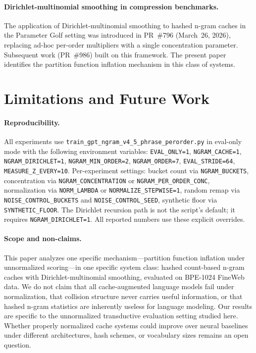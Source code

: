 \documentclass[11pt]{article}
\begin{document}
\paragraph{Dirichlet-multinomial smoothing in compression benchmarks.} The application of Dirichlet-multinomial smoothing to hashed n-gram caches in the Parameter Golf setting was introduced in PR~\#796 (March~26, 2026), replacing ad-hoc per-order multipliers with a single concentration parameter. Subsequent work (PR~\#986) built on this framework. The present paper identifies the partition function inflation mechanism in this class of systems.

\section{Limitations and Future Work}
\label{sec:limitations}

\paragraph{Reproducibility.} All experiments use \texttt{train\_gpt\_ngram\_v4\_5\_phrase\_perorder.py} in eval-only mode with the following environment variables: \texttt{EVAL\_ONLY=1}, \texttt{NGRAM\_CACHE=1}, \texttt{NGRAM\_DIRICHLET=1}, \texttt{NGRAM\_MIN\_ORDER=2}, \texttt{NGRAM\_ORDER=7}, \texttt{EVAL\_STRIDE=64}, \texttt{MEASURE\_Z\_EVERY=10}. Per-experiment settings: bucket count via \texttt{NGRAM\_BUCKETS}, concentration via \texttt{NGRAM\_CONCENTRATION} or \texttt{NGRAM\_PER\_ORDER\_CONC}, normalization via \texttt{NORM\_LAMBDA} or \texttt{NORMALIZE\_STEPWISE=1}, random remap via \texttt{NOISE\_CONTROL\_BUCKETS} and \texttt{NOISE\_CONTROL\_SEED}, synthetic floor via \texttt{SYNTHETIC\_FLOOR}. The Dirichlet recursion path is not the script's default; it requires \texttt{NGRAM\_DIRICHLET=1}. All reported numbers use these explicit overrides.

\paragraph{Scope and non-claims.} This paper analyzes one specific mechanism---partition function inflation under unnormalized scoring---in one specific system class: hashed count-based n-gram caches with Dirichlet-multinomial smoothing, evaluated on BPE-1024 FineWeb data. We do not claim that all cache-augmented language models fail under normalization, that collision structure never carries useful information, or that hashed n-gram statistics are inherently useless for language modeling. Our results are specific to the unnormalized transductive evaluation setting studied here. Whether properly normalized cache systems could improve over neural baselines under different architectures, hash schemes, or vocabulary sizes remains an open question.
\end{document}
